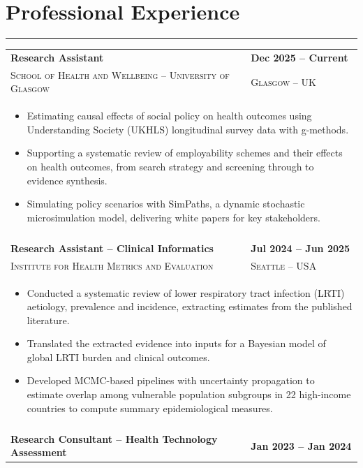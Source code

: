 \section{Professional Experience}
\vspace{-1.5em}
\textcolor{darkgray}{\rule{\textwidth}{0.5pt}}
\begin{longtable}{p{13.4cm}>{\raggedleft\arraybackslash}p{4cm}}
\textbf{Research Assistant} & \textbf{Dec 2025 -- Current} \\
\textsc{School of Health and Wellbeing -- University of Glasgow} & \textsc{Glasgow -- UK} \\
\multicolumn{2}{p{17.4cm}}{%
\begin{itemize}
  \item Estimating causal effects of social policy on health outcomes using Understanding Society (UKHLS) longitudinal survey data with g-methods.
  \item Supporting a systematic review of employability schemes and their effects on health outcomes, from search strategy and screening through to evidence synthesis.
  \item Simulating policy scenarios with SimPaths, a dynamic stochastic microsimulation model, delivering white papers for key stakeholders.
\end{itemize}
} \\
\\
\textbf{Research Assistant -- Clinical Informatics} & \textbf{Jul 2024 -- Jun 2025} \\
\textsc{Institute for Health Metrics and Evaluation} & \textsc{Seattle -- USA} \\
\multicolumn{2}{p{17.4cm}}{%
\begin{itemize}
  \item Conducted a systematic review of lower respiratory tract infection (LRTI) aetiology, prevalence and incidence, extracting estimates from the published literature.
  \item Translated the extracted evidence into inputs for a Bayesian model of global LRTI burden and clinical outcomes.
  \item Developed MCMC-based pipelines with uncertainty propagation to estimate overlap among vulnerable population subgroups in 22 high-income countries to compute summary epidemiological measures.
\end{itemize}
} \\
\\
\textbf{Research Consultant -- Health Technology Assessment} & \textbf{Jan 2023 -- Jan 2024} \\

\end{longtable}
